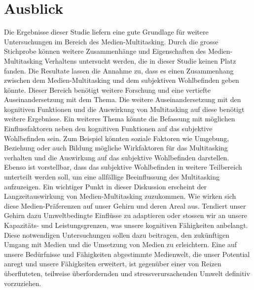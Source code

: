 \section{Ausblick}\label{section.diskussion.ausblick}
Die Ergebnisse dieser Studie liefern eine gute Grundlage für weitere Untersuchungen im Bereich des Medien-Multitasking. Durch die grosse Stichprobe können weitere Zusammenhänge und Eigenschaften des Medien-Multitasking Verhaltens untersucht werden, die in dieser Studie keinen Platz fanden. Die Resultate lassen die Annahme zu, dass es einen Zusammenhang zwischen dem Medien-Multitasking und dem subjektiven Wohlbefinden geben könnte. Dieser Bereich benötigt weitere Forschung und eine vertiefte Auseinandersetzung mit dem Thema. Die weitere Auseinandersetzung mit den kognitiven Funktionen und die Auswirkung von Multitasking auf diese benötigt weitere Ergebnisse. Ein weiteres Thema könnte die Befassung mit möglichen Einflussfaktoren neben den kognitiven Funktionen auf das subjektive Wohlbefinden sein. Zum Beispiel könnten soziale Faktoren wie Umgebung, Beziehung oder auch Bildung mögliche Wirkfaktoren für das Multitasking verhalten und die Auswirkung auf das subjektive Wohlbefinden darstellen. Ebenso ist vorstellbar, dass das subjektive Wohlbefinden in weitere Teilbereich unterteilt werden soll, um eine allfällige Beeinflussung des Multitasking aufzuzeigen. Ein wichtiger Punkt in dieser Diskussion erscheint der Langzeitauswirkung von Medien-Multitasking zuzukommen. Wie wirken sich diese Medien-Präferenzen auf unser Gehirn und deren Areal aus. Tendiert unser Gehirn dazu Umweltbedingte Einflüsse zu adaptieren oder stossen wir an unsere Kapazitäts- und Leistungsgrenzen, was unsere kognitiven Fähigkeiten anbelangt. Diese notwendigen Untersuchungen sollen dazu beitragen, den zukünftigen Umgang mit Medien und die Umsetzung von Medien zu erleichtern. Eine auf unsere Bedürfnisse und Fähigkeiten abgestimmte Medienwelt, die unser Potential anregt und unsere Fähigkeiten erweitert, ist gegenüber einer von Reizen überfluteten, teilweise überfordernden und stressverursachenden Umwelt definitiv vorzuziehen. 

